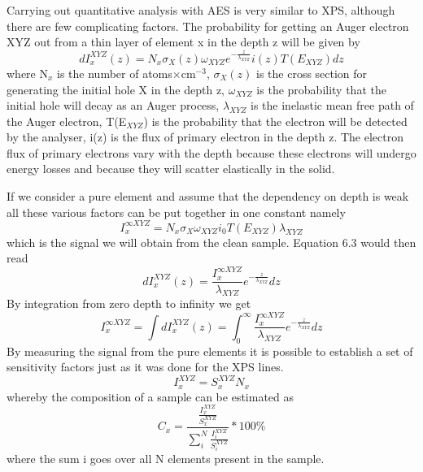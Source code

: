              Carrying out quantitative analysis with AES is very
          similar to XPS, although there are few complicating factors.
          The probability for getting an Auger electron XYZ out from a
          thin layer of element x in the depth z will be given by
          \begin{equation} dI^{XYZ}_{x}(z) = N_{x}\sigma_{X}(z)
          \omega_{XYZ} e^{-\frac{z}{\lambda_{XYZ}}} i(z) T(E_{XYZ}) dz
          \end{equation} where N$_{x}$ is the number of
          atoms$\times$cm$^{-3}$, $\sigma_{X}(z)$ is the cross
          section for generating the initial hole X in the depth z,
          $\omega_{XYZ}$ is the probability that the initial hole will
          decay as an Auger process, ${\lambda_{XYZ}}$ is the
          inelastic mean free path of the Auger electron, T(E$_{XYZ}$)
          is the probability that the electron will be detected by the
          analyser, i(z) is the flux of primary electron in the depth
          z. The electron flux of primary electrons vary with the
          depth because these electrons will undergo energy losses and
          because they will scatter elastically in the solid. 

             If we  consider  a  pure  element  and  assume  that  the
          dependency on depth is weak all these various factors can be
          put  together  in  one  constant   namely
            \begin{equation}
          I^{\infty  XYZ}_{x}   =   N_{x}\sigma_{X}   \omega_{XYZ}   i_{0}
          T(E_{XYZ})\lambda_{XYZ} \end{equation} which is the  signal
          we will obtain from the clean sample.
             Equation 6.3 would then read
            \begin{equation}
          dI_{x}^{XYZ}(z)  =   \frac{I^{\infty   XYZ}_{x}}{\lambda_{XYZ}}
          e^{-\frac{z}{\lambda_{XYZ}}}dz
          \end{equation}
             By integration from zero depth to infinity we get
               \begin{equation}
          I^{\infty   XYZ}_{x}   =   \int   dI_{x}^{XYZ}(z)    =
          \int_{0}^{\infty}\frac{I^{\infty     XYZ}_{x}}{\lambda_{XYZ}}
          e^{-\frac{z}{\lambda_{XYZ}}}dz \end{equation}
          By measuring  the  signal  from  the  pure  elements  it  is
          possible to establish a set of sensitivity factors just as it
          was done for the XPS lines.
               \begin{equation}
          I^{XYZ}_{x} = S_{x}^{XYZ} N_{x}
          \end{equation}
             whereby the composition of a sample can be estimated as
                  \begin{equation}
           C_{x}                                                      =
          \frac{\frac{I^{XYZ}_{x}}{S_{x}^{XYZ}}}{\sum_{i}^{N}\frac{I^{XYZ}_{i}}{S_{i}^{XYZ}}}*100\%
            \end{equation}
          where the sum i goes over all N elements present in the sample.

